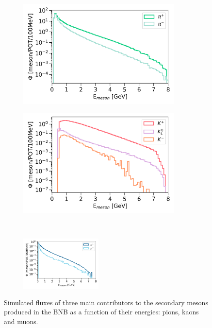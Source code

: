 \begin{figure}[bhtp]
\begin{subfigure}{.5\linewidth}
\centering
\includegraphics[width=0.90\textwidth]{BNB_Meson_Pion_Flux}
\end{subfigure}%
\begin{subfigure}{.5\linewidth}
\centering
\includegraphics[width=0.90\textwidth]{BNB_Meson_Kaon_Flux}
\end{subfigure}\\[1ex]
\begin{subfigure}{\linewidth}
\centering
\includegraphics[width=0.45\textwidth]{BNB_Meson_Muon_Flux}
\end{subfigure}
\caption{
Simulated fluxes of three main contributors to the secondary mesons produced in the BNB as a function of their energies: pions, kaons and muons. 
}
\label{fig:BNB_Meson_Flux}
\end{figure}
